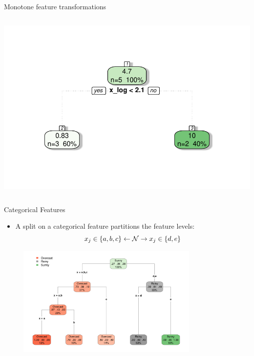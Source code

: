 \documentclass[11pt,compress,t,notes=noshow, xcolor=table]{beamer}
\begin{document}
\begin{vbframe}{Monotone feature transformations}
\begin{columns}[T]
\includegraphics[width = \textwidth]{figure/cart_splitcomp_2}
\end{columns}
\vspace{0.5cm}
\centering
\end{vbframe}

\begin{vbframe}{Categorical Features}
  \begin{itemize}
  \item A split on a categorical feature partitions the feature levels:
    $$x_j \in \{a,b,c\} \leftarrow \mathcal{N} \rightarrow x_j \in \{d,e\} $$
  \end{itemize}
  \begin{figure}
   \includegraphics[width=0.8\textwidth]{figure/tree-categorical.pdf}
  \end{figure}
  \end{vbframe}
\end{document}
